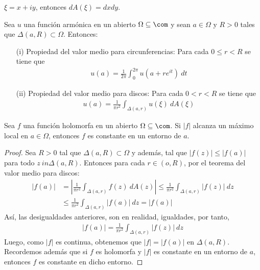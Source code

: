 \begin{obs}
$\xi = x + iy$, entonces $dA(\xi) = dxdy$.
\end{obs}

\begin{cor}
Sea $u$ una función armónica en un abierto $\Omega \subseteq \com$ y sean $a \in \Omega$ y $R > 0$ tales que $\Delta(a,R) \subset \Omega$. Entonces:
\begin{enumerate}
    \item[(i)] Propiedad del valor medio para circunferencias: Para cada $0 \leq r < R$ se tiene que
    \begin{align*}
        u(a) = \frac{1}{2\pi}\int_{0}^{2\pi}{u\left(a + re^{it}\right) \ dt}
    \end{align*}
    \item[(ii)] Propiedad del valor medio para discos: Para cada $0 < r < R$ se tiene que
    \begin{align*}
        u(a) = \frac{1}{\pi r^2}\int_{\Delta(a,r)}{u(\xi) \ dA(\xi)}
    \end{align*}
\end{enumerate}
\end{cor}

\begin{teo}
Sea $f$ una función holomorfa en un abierto $\Omega \subseteq \com$. Si $|f|$ alcanza un máximo local en $a \in \Omega$, entonces $f$ es constante en un entorno de $a$.
\end{teo}

\begin{proof}
Sea $R > 0$ tal que $\Delta(a,R) \subset \Omega$  y además, tal que $|f(z)| \leq |f(a)|$ para todo $z \ in \Delta(a,R)$. Entonces para cada $r \in (o,R)$, por el teorema del valor medio para discos:
\begin{align*}
    |f(a)| &= \left| \frac{1}{\pi r^2} \int_{\Delta(a,r)}{f(z) \ dA(z)} \right| \leq \frac{1}{\pi r^2} \int_{\Delta(a,r)}{|f(z)| \ dz} \\
    & \leq  \frac{1}{\pi r^2} \int_{\Delta(a,r)}{|f(a)| \ dz} = |f(a)|
\end{align*}
Así, las desigualdades anteriores, son en realidad, igualdades, por tanto, 
\begin{align*}
    |f(a)| = \frac{1}{\pi r^2} \int_{\Delta(a,r)}{|f(z)| \ dz}
\end{align*}
Luego, como $|f|$ es continua, obtenemos que $|f| = |f(a)|$ en $\Delta(a,R)$. Recordemos además que si $f$ es holomorfa y $|f|$ es constante en un entorno de $a$, entonces $f$ es constante en dicho entorno.
\end{proof}

